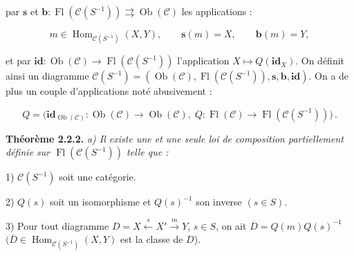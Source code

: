 \clearpage
{}%
\begingroup
\small
\setlength{\emergencystretch}{1.5em}%
\setlength{\abovedisplayskip}{1pt plus 1pt minus 1pt}%
\setlength{\belowdisplayskip}{1pt plus 1pt minus 1pt}%

\noindent par $\mathbf{s}$ et $\mathbf{b}\colon
\operatorname{Fl}(\mathcal C(S^{-1}))\rightrightarrows
\operatorname{Ob}(\mathcal C)$ les applications :

\[
  m\in\operatorname{Hom}_{\mathcal C(S^{-1})}(X,Y),\qquad
  \mathbf{s}(m)=X,\qquad \mathbf{b}(m)=Y,
\]

\noindent et par $\mathbf{id}\colon\operatorname{Ob}(\mathcal C)
\to\operatorname{Fl}(\mathcal C(S^{-1}))$ l'application
$X\mapsto Q(\mathbf{id}_X)$.
%
On définit ainsi un diagramme
$\mathcal C(S^{-1})=(\operatorname{Ob}(\mathcal C),
\operatorname{Fl}(\mathcal C(S^{-1})),\mathbf{s},\mathbf{b},\mathbf{id})$.
On a de plus un couple d'applications noté abusivement :

\[
  Q=\bigl(\mathbf{id}_{\operatorname{Ob}(\mathcal C)}\colon
  \operatorname{Ob}(\mathcal C)\to\operatorname{Ob}(\mathcal C),\;
  Q\colon\operatorname{Fl}(\mathcal C)\to
  \operatorname{Fl}(\mathcal C(S^{-1}))\bigr)\,.
\]

\smallskip
\noindent\textbf{Théorème 2.2.2.}\quad
\begingroup\itshape
{}%
a) Il existe une et une seule loi de composition partiellement définie sur
$\operatorname{Fl}(\mathcal C(S^{-1}))$ telle que :

\par\noindent\hspace*{2em}1) $\mathcal C(S^{-1})$ soit une catégorie.

\par\noindent\hspace*{2em}2) $Q(s)$ soit un isomorphisme et $Q(s)^{-1}$ son
inverse $(s\in S)$.

\par\noindent\hspace*{2em}3) Pour tout diagramme
$D=X\xleftarrow{s}X'\xrightarrow{m}Y$, $s\in S$, on ait
$\overline D=Q(m)Q(s)^{-1}$
$(\overline D\in\operatorname{Hom}_{\mathcal C(S^{-1})}(X,Y)$ est la classe
de $D$).


